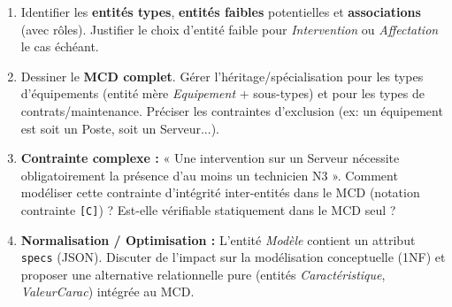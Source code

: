 \documentclass[11pt]{article}
\begin{document}
\begin{exercice}
\begin{enumerate}
    \item Identifier les \textbf{entités types}, \textbf{entités faibles} potentielles et \textbf{associations} (avec rôles). Justifier le choix d'entité faible pour \textit{Intervention} ou \textit{Affectation} le cas échéant.
    \item Dessiner le \textbf{MCD complet}. Gérer l'héritage/spécialisation pour les types d'équipements (entité mère \textit{Equipement} + sous-types) et pour les types de contrats/maintenance. Préciser les contraintes d'exclusion (ex: un équipement est soit un Poste, soit un Serveur...).
    \item \textbf{Contrainte complexe :} « Une intervention sur un Serveur nécessite obligatoirement la présence d'au moins un technicien N3 ». Comment modéliser cette contrainte d'intégrité inter-entités dans le MCD (notation contrainte \texttt{[C]}) ? Est-elle vérifiable statiquement dans le MCD seul ?
    \item \textbf{Normalisation / Optimisation :} L'entité \textit{Modèle} contient un attribut \texttt{specs} (JSON). Discuter de l'impact sur la modélisation conceptuelle (1NF) et proposer une alternative relationnelle pure (entités \textit{Caractéristique}, \textit{ValeurCarac}) intégrée au MCD.
\end{enumerate}
\end{exercice}
\end{document}
